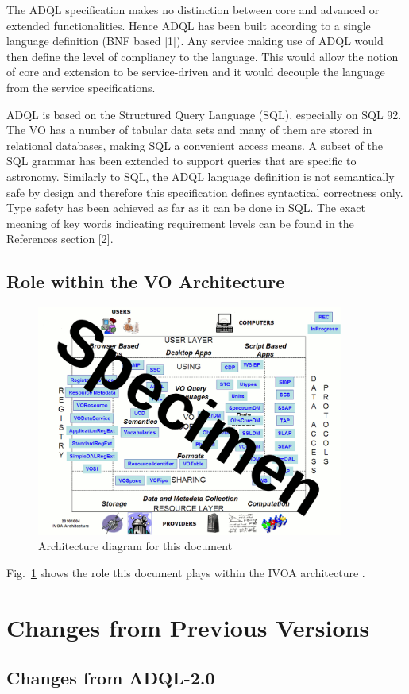 \documentclass[11pt,a4paper]{ivoa}
\begin{document}
The ADQL specification makes no distinction between core and advanced or
extended functionalities. Hence ADQL has been built according to a single
language definition (BNF based [1]). Any service making use of ADQL would
then define the level of compliancy to the language. This would allow the notion
of core and extension to be service-driven and it would decouple the language
from the service specifications.

ADQL is based on the Structured Query Language (SQL), especially on SQL 92.
The VO has a number of tabular data sets and many of them are stored in
relational databases, making SQL a convenient access means. A subset of the
SQL grammar has been extended to support queries that are specific to
astronomy. Similarly to SQL, the ADQL language definition is not semantically
safe by design and therefore this specification defines syntactical correctness
only. Type safety has been achieved as far as it can be done in SQL.
The exact meaning of key words indicating requirement levels can be found in
the References section [2].

\subsection{Role within the VO Architecture}

\begin{figure}
\centering
\includegraphics[width=0.9\textwidth]{archdiag.png}
\caption{Architecture diagram for this document}
\label{fig:archdiag}
\end{figure}

Fig.~\ref{fig:archdiag} shows the role this document plays within the
IVOA architecture \citep{note:VOARCH}.

\appendix

\section{Changes from Previous Versions}

\subsection{Changes from ADQL-2.0}





\end{document}
